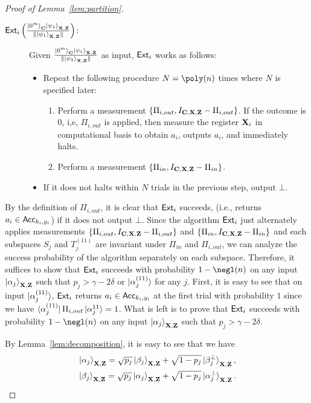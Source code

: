 \begin{proof}[Proof of Lemma~\ref{lem:partition}]
\begin{description}
\item[$\mathsf{Ext}_{i}\left(\frac{\ket{0^m}_{\mathbf{C}}\ket{\psi_1}_{\mathbf{X},\mathbf{Z}}}{\|\ket{\psi_1}_{\mathbf{X},\mathbf{Z}}\|}\right)$:]
Given $\frac{\ket{0^m}_{\mathbf{C}}\ket{\psi_1}_{\mathbf{X},\mathbf{Z}}}{\|\ket{\psi_1}_{\mathbf{X},\mathbf{Z}}\|}$ as input, $\mathsf{Ext}_{i}$ works as follows:
\begin{itemize}
\item Repeat the following procedure $N=\poly(\secpar)$ times where $N$ is specified later:
\begin{enumerate}
\item Perform a measurement $\{\Pi_{i,out},I_{\mathbf{C},\mathbf{X},\mathbf{Z}}-\Pi_{i,out}\}$. If the outcome is $0$, i,e, $\Pi_{i,out}$ is applied, then measure the register $\mathbf{X}_i$ in computational basis to obtain $a_i$, outputs $a_i$, and immediately halts.
\item  Perform a measurement $\{\Pi_{in},I_{\mathbf{C},\mathbf{X},\mathbf{Z}}-\Pi_{in}\}$.
\end{enumerate}
\item If it does not halts within $N$ trials in the previous step, output $\bot$.
\end{itemize}
\end{description}

By the definition of $\Pi_{i,out}$, it is clear that $\mathsf{Ext}_{i}$ succeeds, (i.e., returns $a_i\in \mathsf{Acc}_{k_i,y_i}$) if it does not output $\bot$.
Since the algorithm $\mathsf{Ext}_{i}$ just alternately applies measurements $\{\Pi_{i,out},I_{\mathbf{C},\mathbf{X},\mathbf{Z}}-\Pi_{i,out}\}$ and $\{\Pi_{in},I_{\mathbf{C},\mathbf{X},\mathbf{Z}}-\Pi_{in}\}$ and each subspaces $S_j$ and $T_j^{(11)}$ are invariant under $\Pi_{in}$ and $\Pi_{i,out}$, we can analyze the success probability of the algorithm separately on each subspace.
Therefore, it suffices to show that $\mathsf{Ext}_{i}$ succeeds with probability $1-\negl(\secpar)$ on any input $\ket{\alpha_j}_{\mathbf{X},\mathbf{Z}}$ such that  $p_j> \gamma-2\delta$ or $\ket{\alpha_j^{(11)}}$ for any $j$.
First, it is easy to see that on input $\ket{\alpha_j^{(11)}}$, $\mathsf{Ext}_{i}$ returns $a_i\in \mathsf{Acc}_{k_i,y_i}$ at the first trial with probability $1$ since we have $\bra{\alpha_{j}^{(11)}} \Pi_{i,out} \ket{\alpha_{j}^{11}}=1$.
What is left is to prove that $\mathsf{Ext}_{i}$ succeeds with probability $1-\negl(\secpar)$ on any input $\ket{\alpha_j}_{\mathbf{X},\mathbf{Z}}$ such that  $p_j> \gamma-2\delta$. 

By Lemma~\ref{lem:decomposition}, it is easy to see that we have
\begin{align*}
&\ket{\alpha_j}_{\mathbf{X},\mathbf{Z}}=\sqrt{p_j}\ket{\beta_j}_{\mathbf{X},\mathbf{Z}}+\sqrt{1-p_j}\ket{\beta_j^\bot}_{\mathbf{X},\mathbf{Z}},\\
&\ket{\beta_j}_{\mathbf{X},\mathbf{Z}}=\sqrt{p_j}\ket{\alpha_j}_{\mathbf{X},\mathbf{Z}}+\sqrt{1-p_j}\ket{\alpha_j^\bot}_{\mathbf{X},\mathbf{Z}}.
\end{align*}


\end{proof}
